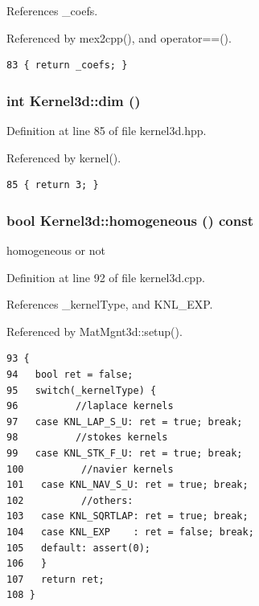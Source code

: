References \_\-coefs.

Referenced by mex2cpp(), and operator==().

\footnotesize\begin{verbatim}83 { return _coefs; }
\end{verbatim}\normalsize 


\subsubsection{\setlength{\rightskip}{0pt plus 5cm}int Kernel3d::dim ()\hspace{0.3cm}{\tt  [inline]}}\label{classKernel3d_e3f9953141ca7d7525b58c0ff1ef6b1f_e3f9953141ca7d7525b58c0ff1ef6b1f}




Definition at line 85 of file kernel3d.hpp.

Referenced by kernel().

\footnotesize\begin{verbatim}85 { return 3; }
\end{verbatim}\normalsize 


\subsubsection{\setlength{\rightskip}{0pt plus 5cm}bool Kernel3d::homogeneous () const}\label{classKernel3d_215ba8957cc7ea3494813f5b1c2fc866_215ba8957cc7ea3494813f5b1c2fc866}


homogeneous or not 



Definition at line 92 of file kernel3d.cpp.

References \_\-kernel\-Type, and KNL\_\-EXP.

Referenced by Mat\-Mgnt3d::setup().

\footnotesize\begin{verbatim}93 {
94   bool ret = false;
95   switch(_kernelType) {
96          //laplace kernels
97   case KNL_LAP_S_U: ret = true; break;
98          //stokes kernels
99   case KNL_STK_F_U: ret = true; break;
100          //navier kernels
101   case KNL_NAV_S_U: ret = true; break;
102          //others:
103   case KNL_SQRTLAP: ret = true; break;
104   case KNL_EXP    : ret = false; break;
105   default: assert(0);
106   }
107   return ret;
108 }
\end{verbatim}\normalsize 


